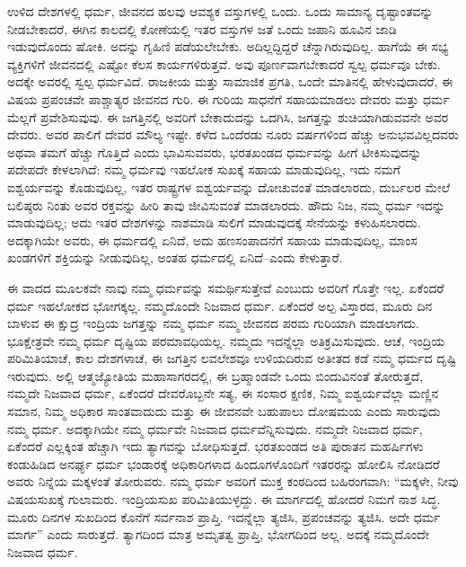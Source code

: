 ಉಳಿದ ದೇಶಗಳಲ್ಲಿ ಧರ್ಮ, ಜೀವನದ ಹಲವು ಆವಶ್ಯಕ ವಸ್ತುಗಳಲ್ಲಿ ಒಂದು. ಒಂದು ಸಾಮಾನ್ಯ ದೃಷ್ಟಾಂತವನ್ನು ನೀಡಬೇಕಾದರೆ, ಈಗಿನ ಕಾಲದಲ್ಲಿ ಕೋಣೆಯಲ್ಲಿ ಇತರ ವಸ್ತುಗಳ ಜತೆ ಒಂದು ಜಪಾನಿ ಹೂವಿನ ಜಾಡಿ ಇಡುವುದೊಂದು ಷೋಕಿ. ಅದನ್ನು ಗೃಹಿಣಿ ಪಡೆಯಲೇಬೇಕು. ಅದಿಲ್ಲದ್ದಿದ್ದರೆ ಚೆನ್ನಾಗಿರುವುದಿಲ್ಲ. ಹಾಗೆಯೆ ಈ ಸಭ್ಯ ವ್ಯಕ್ತಿಗಳಿಗೆ ಜೀವನದಲ್ಲಿ ಎಷ್ಟೋ ಕೆಲಸ ಕಾರ್ಯಗಳಿರುತ್ತವೆ. ಅವು ಪೂರ್ಣವಾಗಬೇಕಾದರೆ ಸ್ವಲ್ಪ ಧರ್ಮವೂ ಬೇಕು. ಅದಕ್ಕೇ ಅವರಲ್ಲಿ ಸ್ವಲ್ಪ ಧರ್ಮವಿದೆ. ರಾಜಕೀಯ ಮತ್ತು ಸಾಮಾಜಿಕ ಪ್ರಗತಿ, ಒಂದೇ ಮಾತಿನಲ್ಲಿ ಹೇಳುವುದಾದರೆ, ಈ ವಿಷಯ ಪ್ರಪಂಚವೇ ಪಾಶ್ಚಾತ್ಯರ ಜೀವನದ ಗುರಿ. ಈ ಗುರಿಯ ಸಾಧನೆಗೆ ಸಹಾಯಮಾಡಲು ದೇವರು ಮತ್ತು ಧರ್ಮ ಮೆಲ್ಲಗೆ ಪ್ರವೇಶಿಸುವುವು. ಈ ಜಗತ್ತಿನಲ್ಲಿ ಅವರಿಗೆ ಬೇಕಾದುದನ್ನು ಒದಗಿಸಿ, ಜಗತ್ತನ್ನು ಶುಚಿಯಾಗಿಡುವವನೇ ಅವರ ದೇವರು. ಅವರ ಪಾಲಿಗೆ ದೇವರ ಮೌಲ್ಯ ಇಷ್ಟೇ. ಕಳೆದ ಒಂದೆರಡು ನೂರು ವರ್ಷಗಳಿಂದ ಹೆಚ್ಚು ಅನುಭವವಿಲ್ಲದವರು ಅಥವಾ ತಮಗೆ ಹೆಚ್ಚು ಗೊತ್ತಿದೆ ಎಂದು ಭಾವಿಸುವವರು, ಭರತಖಂಡದ ಧರ್ಮವನ್ನು ಹೀಗೆ ಟೀಕಿಸುವುದನ್ನು ಪದೇಪದೇ ಕೇಳಲಾಗಿದೆ: ನಮ್ಮ ಧರ್ಮವು ಇಹಲೋಕ ಸುಖಕ್ಕೆ ಸಹಾಯ ಮಾಡುವುದಿಲ್ಲ, ಇದು ನಮಗೆ ಐಶ್ವರ್ಯವನ್ನು ಕೊಡುವುದಿಲ್ಲ, ಇತರ ರಾಷ್ಟ್ರಗಳ ಐಶ್ವರ್ಯವನ್ನು ದೋಚುವಂತೆ ಮಾಡಲಾರದು, ದುರ್ಬಲರ ಮೇಲೆ ಬಲಿಷ್ಠರು ನಿಂತು ಅವರ ರಕ್ತವನ್ನು ಹೀರಿ ತಾವು ಜೀವಿಸುವಂತೆ ಮಾಡಲಾರದು. ಹೌದು ನಿಜ, ನಮ್ಮ ಧರ್ಮ ಇದನ್ನು ಮಾಡುವುದಿಲ್ಲ; ಅದು ಇತರ ದೇಶಗಳನ್ನು ನಾಶಮಾಡಿ ಸುಲಿಗೆ ಮಾಡುವುದಕ್ಕೆ ಸೇನೆಯನ್ನು ಕಳುಹಿಸ\-ಲಾರದು. ಅದಕ್ಕಾಗಿಯೇ ಅವರು, ಈ ಧರ್ಮದಲ್ಲಿ ಏನಿದೆ, ಅದು ಹಣಸಂಪಾದನೆಗೆ ಸಹಾಯ ಮಾಡುವುದಿಲ್ಲ, ಮಾಂಸ ಖಂಡಗಳಿಗೆ ಶಕ್ತಿಯನ್ನು ನೀಡುವುದಿಲ್ಲ, ಅಂತಹ ಧರ್ಮದಲ್ಲಿ ಏನಿದೆ–ಎಂದು ಕೇಳುತ್ತಾರೆ.

ಈ ವಾದದ ಮೂಲಕವೇ ನಾವು ನಮ್ಮ ಧರ್ಮವನ್ನು ಸಮರ್ಥಿಸುತ್ತೇವೆ ಎಂಬುದು ಅವರಿಗೆ ಗೊತ್ತೇ ಇಲ್ಲ. ಏಕೆಂದರೆ ಧರ್ಮ ಇಹಲೋಕದ ಭೋಗಕ್ಕಲ್ಲ. ನಮ್ಮದೊಂದೇ ನಿಜವಾದ ಧರ್ಮ. ಏಕೆಂದರೆ ಅಲ್ಪ ವಿಸ್ತಾರದ, ಮೂರು ದಿನ ಬಾಳುವ ಈ ಕ್ಷುದ್ರ ಇಂದ್ರಿಯ ಜಗತ್ತನ್ನು ನಮ್ಮ ಧರ್ಮ ನಮ್ಮ ಜೀವನದ ಪರಮ ಗುರಿಯಾಗಿ ಮಾಡಲಾಗದು. ಭೂಕ್ಷೇತ್ರವೇ ನಮ್ಮ ಧರ್ಮ ದೃಷ್ಟಿಯ ಪರಮಾವಧಿಯಲ್ಲ. ನಮ್ಮದು ಇದನ್ನೆಲ್ಲಾ ಅತಿಕ್ರಮಿಸುವುದು. ಆಚೆ, ಇಂದ್ರಿಯ ಪರಿಮಿತಿಯಾಚೆ, ಕಾಲ ದೇಶಗಳಾಚೆ, ಈ ಜಗತ್ತಿನ ಲವಲೇಶವೂ ಉಳಿಯದಿರುವ ಅತೀತದ ಕಡೆ ನಮ್ಮ ಧರ್ಮದ ದೃಷ್ಟಿ ಇರುವುದು. ಅಲ್ಲಿ ಆತ್ಮಜ್ಯೋತಿಯ ಮಹಾಸಾಗರದಲ್ಲಿ, ಈ ಬ್ರಹ್ಮಾಂಡವೇ ಒಂದು ಬಿಂದುವಿನಂತೆ ತೋರುತ್ತದೆ, ನಮ್ಮದೇ ನಿಜವಾದ ಧರ್ಮ, ಏಕೆಂದರೆ ದೇವರೊಬ್ಬನೇ ಸತ್ಯ, ಈ ಸಂಸಾರ ಕ್ಷಣಿಕ, ನಿಮ್ಮ ಐಶ್ವರ್ಯವೆಲ್ಲಾ ಮಣ್ಣಿನ ಸಮಾನ, ನಿಮ್ಮ ಅಧಿಕಾರ ಸಾಂತವಾದುದು ಮತ್ತು ಈ ಜೀವನವೇ ಬಹುಪಾಲು ದೋಷಮಯ ಎಂದು ಸಾರುವುದು ನಮ್ಮ ಧರ್ಮ. ಅದಕ್ಕಾಗಿಯೇ ನಮ್ಮ ಧರ್ಮವೇ ನಿಜವಾದ ಧರ್ಮವೆನ್ನಿಸುವುದು. ನಮ್ಮದೇ ನಿಜವಾದ ಧರ್ಮ, ಏಕೆಂದರೆ ಎಲ್ಲಕ್ಕಿಂತ ಹೆಚ್ಚಾಗಿ ಇದು ತ್ಯಾಗವನ್ನು ಬೋಧಿಸುತ್ತದೆ. ಭರತಖಂಡದ ಅತಿ ಪುರಾತನ ಮಹರ್ಷಿಗಳು ಕಂಡುಹಿಡಿದ ಅನರ್ಘ್ಯ ಧರ್ಮ ಭಂಡಾರಕ್ಕೆ ಅಧಿಕಾರಿಗಳಾದ ಹಿಂದೂಗಳೊಂದಿಗೆ ಇತರರನ್ನು ಹೋಲಿಸಿ ನೋಡಿದರೆ ಅವರು ನಿನ್ನೆಯ ಮಕ್ಕಳಂತೆ ತೋರುವರು. ನಮ್ಮ ಧರ್ಮ ಅವರಿಗೆ ಮುಕ್ತ ಕಂಠದಿಂದ ಬಹಿರಂಗವಾಗಿ: “ಮಕ್ಕಳೇ, ನೀವು ವಿಷಯಸುಖಕ್ಕೆ ಗುಲಾಮರು. ಇಂದ್ರಿಯಸುಖ ಪರಿಮಿತಿಯುಳ್ಳದ್ದು. ಈ ಮಾರ್ಗದಲ್ಲಿ ಹೋದರೆ ನಿಮಗೆ ನಾಶ ಸಿದ್ಧ. ಮೂರು ದಿನಗಳ ಸುಖದಿಂದ ಕೊನೆಗೆ ಸರ್ವನಾಶ ಪ್ರಾಪ್ತಿ. ಇದನ್ನೆಲ್ಲಾ ತ್ಯಜಿಸಿ, ಪ್ರಪಂಚವನ್ನು ತ್ಯಜಿಸಿ. ಅದೇ ಧರ್ಮ ಮಾರ್ಗ” ಎಂದು ಸಾರುತ್ತದೆ. ತ್ಯಾಗದಿಂದ ಮಾತ್ರ ಅಮೃತತ್ವ ಪ್ರಾಪ್ತಿ, ಭೋಗದಿಂದ ಅಲ್ಲ. ಅದಕ್ಕೆ ನಮ್ಮದೊಂದೇ ನಿಜವಾದ ಧರ್ಮ.

\newpage

